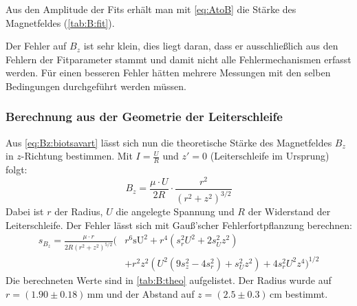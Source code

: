 Aus den Amplitude der Fits erhält man mit \autoref{eq:AtoB} die Stärke des Magnetfeldes (\autoref{tab:B:fit}).

Der Fehler auf $B_z$ ist sehr klein, dies liegt daran, dass er ausschließlich aus den Fehlern der Fitparameter stammt und damit nicht alle 
Fehlermechanismen erfasst werden. Für einen besseren Fehler hätten mehrere Messungen mit den selben Bedingungen durchgeführt werden müssen.

\subsubsection{Berechnung aus der Geometrie der Leiterschleife}
Aus \autoref{eq:Bz:biotsavart} lässt sich nun die theoretische Stärke des Magnetfeldes $B_z$ in $z$-Richtung bestimmen. 
Mit $I = \frac{U}{R}$ und $z'=0$ (Leiterschleife im Ursprung) folgt:
\begin{equation}
  B_z = \frac{\mu \cdot U}{2 R} \cdot \frac{r^2}{ \left( r^2 + z^2 \right)^{3/2}}
\end{equation}
Dabei ist $r$ der Radius, $U$ die angelegte Spannung und $R$ der Widerstand der Leiterschleife. Der Fehler lässt sich mit Gauß'scher 
Fehlerfortpflanzung berechnen:
\begin{equation}
  \begin{split}
     s_{B_z} = \frac{\mu \cdot r}{2 R \left(r^2+z^2\right)^{5/2}} \big( & r^6 \text{sU}^2+r^4 \left(s_r^2 U^2+2 s_U^2 z^2\right) \\ 
     &+r^2 z^2 \left(U^2 \left(9 s_z^2-4 s_r^2\right)+s_U^2 z^2\right)+4 s_r^2 U^2 z^4 \big)^{1/2}
  \end{split}
\end{equation}
Die berechneten Werte sind in \autoref{tab:B:theo} aufgelistet. Der Radius wurde auf $r=(1.90 \pm 0.18)\,$mm und der Abstand auf 
$z=(2.5 \pm 0.3)\,$cm bestimmt.



